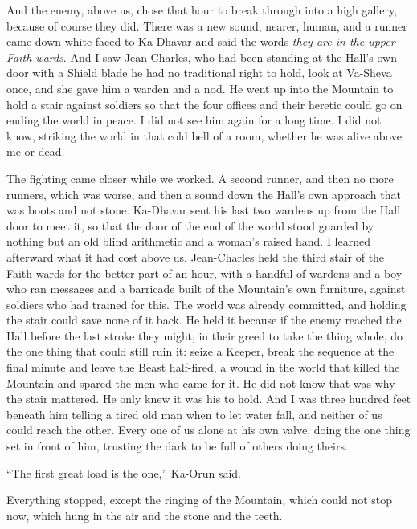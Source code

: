 And the enemy, above us, chose that hour to break through into a high gallery, because of course they did. There was a new sound, nearer, human, and a runner came down white-faced to Ka-Dhavar and said the words \emph{they are in the upper Faith wards}. And I saw Jean-Charles, who had been standing at the Hall's own door with a Shield blade he had no traditional right to hold, look at Va-Sheva once, and she gave him a warden and a nod. He went up into the Mountain to hold a stair against soldiers so that the four offices and their heretic could go on ending the world in peace. I did not see him again for a long time. I did not know, striking the world in that cold bell of a room, whether he was alive above me or dead.\par

The fighting came closer while we worked. A second runner, and then no more runners, which was worse, and then a sound down the Hall's own approach that was boots and not stone. Ka-Dhavar sent his last two wardens up from the Hall door to meet it, so that the door of the end of the world stood guarded by nothing but an old blind arithmetic and a woman's raised hand. I learned afterward what it had cost above us. Jean-Charles held the third stair of the Faith wards for the better part of an hour, with a handful of wardens and a boy who ran messages and a barricade built of the Mountain's own furniture, against soldiers who had trained for this. The world was already committed, and holding the stair could save none of it back. He held it because if the enemy reached the Hall before the last stroke they might, in their greed to take the thing whole, do the one thing that could still ruin it: seize a Keeper, break the sequence at the final minute and leave the Beast half-fired, a wound in the world that killed the Mountain and spared the men who came for it. He did not know that was why the stair mattered. He only knew it was his to hold. And I was three hundred feet beneath him telling a tired old man when to let water fall, and neither of us could reach the other. Every one of us alone at his own valve, doing the one thing set in front of him, trusting the dark to be full of others doing theirs.\par

\ornament

``The first great load is the one,'' Ka-Orun said.\par

Everything stopped, except the ringing of the Mountain, which could not stop now, which hung in the air and the stone and the teeth.\par

